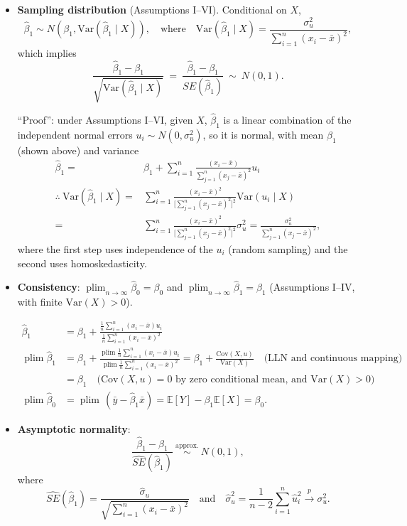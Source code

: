 \documentclass[11pt]{article}
\newcommand\E{\mathbb{E}}
\newcommand{\var}{\text{Var}}
\newcommand{\cov}{\text{Cov}}
\DeclareMathOperator*\plim{plim}
\begin{document}
\begin{itemize}
\item \textbf{Sampling distribution} (Assumptions I--VI). Conditional on $X$,
$$\hat{\beta}_1 \sim N\left(\beta_1, \var(\hat{\beta}_1\mid X)\right),
\quad\text{where}\quad \var(\hat{\beta}_1\mid X) = \frac{\sigma^2_u}{\sum_{i=1}^n(x_i - \bar{x})^2},$$
which implies
$$\frac{\hat{\beta}_1 - \beta_1}{\sqrt{\var(\hat{\beta}_1\mid X)}}
\ = \ \frac{\hat{\beta}_1 - \beta_1}{SE(\hat\beta_1)} \ \sim \ N(0,1).$$

``Proof'': under Assumptions I--VI, given $X$, $\hat{\beta}_1$ is a linear combination of the independent normal errors $u_i \sim N(0,\sigma_u^2)$, so it is normal, with mean $\beta_1$ (shown above) and variance
\begin{align*}
\hat{\beta}_1  =& \beta_1 + \sum_{i=1}^n \frac{(x_i - \bar{x})}{\sum_{j=1}^n (x_j - \bar{x})^2}u_i \\
\therefore\ \var(\hat{\beta}_1\mid X) = & \sum_{i=1}^n \frac{(x_i - \bar{x})^{2}}{\big[\sum_{j=1}^n (x_j - \bar{x})^2\big]^{2}} \var(u_i\mid X) \\
= & \sum_{i=1}^n \frac{(x_i - \bar{x})^{2}}{\big[\sum_{j=1}^n (x_j - \bar{x})^2\big]^{2}} \sigma_{u}^{2}
=  \frac{\sigma_{u}^{2}}{\sum_{j=1}^n (x_j - \bar{x})^2},
\end{align*}
where the first step uses independence of the $u_i$ (random sampling) and the second uses homoskedasticity.
\bigskip

\item \textbf{Consistency}: $\plim_{n\to\infty} \hat{\beta}_{0} = \beta_0$ and $\plim_{n\to\infty} \hat{\beta}_{1} = \beta_1$ (Assumptions I--IV, with finite $\var(X) > 0$).

\begin{align*}
\hat{\beta}_1 & = \beta_1 + \frac{\frac{1}{n}\sum_{i=1}^n (x_i - \bar{x})u_i }{\frac{1}{n}\sum_{i=1}^n (x_i - \bar{x})^2} \\
\plim \hat{\beta}_1 & =  \beta_1 + \frac{\plim\frac{1}{n}\sum_{i=1}^n (x_i - \bar{x})u_i }
 {\plim\frac{1}{n}\sum_{i=1}^n (x_i - \bar{x})^2}
  =  \beta_1 + \frac{\cov(X,u)}{\var(X)} \quad \text{(LLN and continuous mapping)} \\
 & =  \beta_1 \quad \text{($\cov(X,u)=0$ by zero conditional mean, and $\var(X)>0$)}\\
 \plim \hat{\beta}_{0} &= \plim\,(\bar y - \hat\beta_1\bar x) = \E[Y] - \beta_1\E[X] = \beta_{0}.
\end{align*}
\clearpage

\item \textbf{Asymptotic normality}:
$$
\frac{\hat{\beta}_1 - \beta_1}{\widehat{SE}(\hat{\beta}_1)} \ \stackrel{\text{approx.}}{\sim} \ N(0,1),
$$
where
$$
\widehat{SE}(\hat\beta_1) = \frac{\hat{\sigma}_{u}}{\sqrt{\sum_{i=1}^n (x_i - \bar{x})^2}}
\quad\text{and}\quad
\hat{\sigma}^2_{u}=\frac{1}{n-2}\sum_{i=1}^n \hat{u}_i^2 \stackrel{p}{\rightarrow} \sigma^2_u .
$$


\end{itemize}
\end{document}
